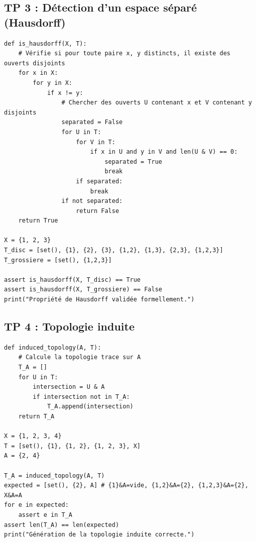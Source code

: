 \documentclass[11pt,a4paper]{article}
\begin{document}
\subsection*{TP 3 : Détection d'un espace séparé (Hausdorff)}
\begin{lstlisting}
def is_hausdorff(X, T):
    # Vérifie si pour toute paire x, y distincts, il existe des ouverts disjoints
    for x in X:
        for y in X:
            if x != y:
                # Chercher des ouverts U contenant x et V contenant y disjoints
                separated = False
                for U in T:
                    for V in T:
                        if x in U and y in V and len(U & V) == 0:
                            separated = True
                            break
                    if separated:
                        break
                if not separated:
                    return False
    return True

X = {1, 2, 3}
T_disc = [set(), {1}, {2}, {3}, {1,2}, {1,3}, {2,3}, {1,2,3}]
T_grossiere = [set(), {1,2,3}]

assert is_hausdorff(X, T_disc) == True
assert is_hausdorff(X, T_grossiere) == False
print("Propriété de Hausdorff validée formellement.")
\end{lstlisting}

\subsection*{TP 4 : Topologie induite}
\begin{lstlisting}
def induced_topology(A, T):
    # Calcule la topologie trace sur A
    T_A = []
    for U in T:
        intersection = U & A
        if intersection not in T_A:
            T_A.append(intersection)
    return T_A

X = {1, 2, 3, 4}
T = [set(), {1}, {1, 2}, {1, 2, 3}, X]
A = {2, 4}

T_A = induced_topology(A, T)
expected = [set(), {2}, A] # {1}&A=vide, {1,2}&A={2}, {1,2,3}&A={2}, X&A=A
for e in expected:
    assert e in T_A
assert len(T_A) == len(expected)
print("Génération de la topologie induite correcte.")
\end{lstlisting}
\end{document}
